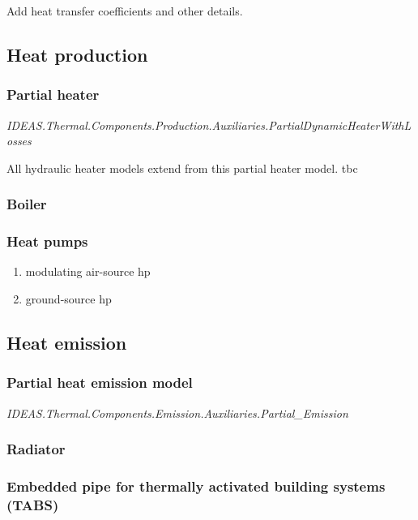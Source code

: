 Add heat transfer coefficients and other details.

\subsection{Heat production}

\subsubsection{Partial heater}

\emph{IDEAS.Thermal.Components.Production.Auxiliaries.PartialDynamicHeaterWithLosses}

\vspace{6mm}

All hydraulic heater models extend from this partial heater model.  
tbc

\subsubsection{Boiler}

\subsubsection{Heat pumps}

\begin{enumerate}
	\item modulating air-source hp
	\item ground-source hp
\end{enumerate}

\subsection{Heat emission}

\subsubsection{Partial heat emission model}

\emph{IDEAS.Thermal.Components.Emission.Auxiliaries.Partial_Emission}
\vspace{6mm}

\subsubsection{Radiator}

\subsubsection{Embedded pipe for thermally activated building systems (TABS)}

